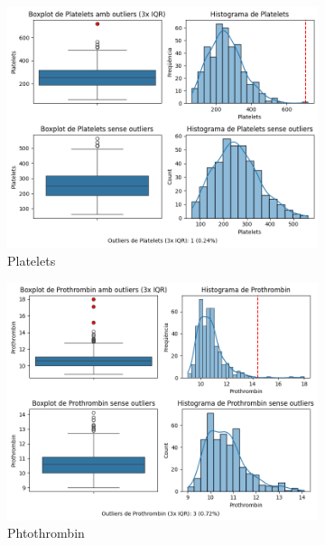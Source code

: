 \begin{figure}[H]
\centering

\begin{subfigure}{.5\textwidth}
  \centering
  \includegraphics[width=.95\linewidth]{img/outliers_Platelets.png}
  \caption{Platelets}
\end{subfigure}%
\begin{subfigure}{.5\textwidth}
  \centering
  \includegraphics[width=.95\linewidth]{img/outliers_Prothrombin.png}
  \caption{Phtothrombin}
\end{subfigure}
\begin{subfigure}{.5\textwidth}
  \centering

\end{subfigure}
\end{figure}
